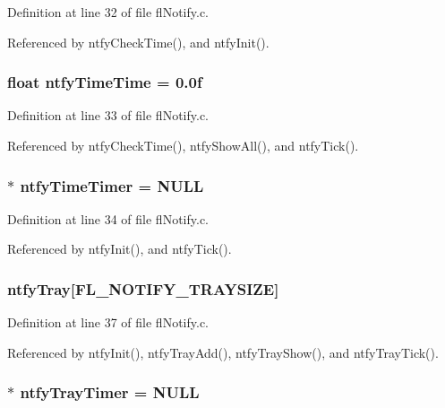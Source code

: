 Definition at line 32 of file fl\-Notify.c.

Referenced by ntfy\-Check\-Time(), and ntfy\-Init().
\subsubsection{\setlength{\rightskip}{0pt plus 5cm}float {\bf ntfy\-Time\-Time} = 0.0f}\label{flNotify_8c_6ba80c402400303f97ee31f55512a7fd}




Definition at line 33 of file fl\-Notify.c.

Referenced by ntfy\-Check\-Time(), ntfy\-Show\-All(), and ntfy\-Tick().
\subsubsection{$\ast$ {\bf ntfy\-Time\-Timer} = NULL}\label{flNotify_8c_4de40991164a87ce80583f843c5ff083}




Definition at line 34 of file fl\-Notify.c.

Referenced by ntfy\-Init(), and ntfy\-Tick().
\subsubsection{ {\bf ntfy\-Tray}[FL\_\-NOTIFY\_\-TRAYSIZE]}\label{flNotify_8c_456b0084ad987c08d2efbe9342b1dd27}




Definition at line 37 of file fl\-Notify.c.

Referenced by ntfy\-Init(), ntfy\-Tray\-Add(), ntfy\-Tray\-Show(), and ntfy\-Tray\-Tick().
\subsubsection{$\ast$ {\bf ntfy\-Tray\-Timer} = NULL}\label{flNotify_8c_6b3b93c9625bce65cd1d21fb55836de8}





